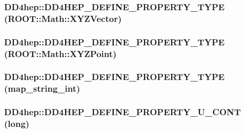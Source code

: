 \label{namespace_d_d4hep_a8b032fe993ba835daea31abfe2fa1d19}
\hypertarget{namespace_d_d4hep_a837feac073c4437c1df965f9a8fb768e}{
\subsubsection[{DD4HEP\_\-DEFINE\_\-PROPERTY\_\-TYPE}]{\setlength{\rightskip}{0pt plus 5cm}DD4hep::DD4HEP\_\-DEFINE\_\-PROPERTY\_\-TYPE (ROOT::Math::XYZVector)}}
\label{namespace_d_d4hep_a837feac073c4437c1df965f9a8fb768e}
\hypertarget{namespace_d_d4hep_a622b20d2110955cfac58aee38d3d2f62}{
\subsubsection[{DD4HEP\_\-DEFINE\_\-PROPERTY\_\-TYPE}]{\setlength{\rightskip}{0pt plus 5cm}DD4hep::DD4HEP\_\-DEFINE\_\-PROPERTY\_\-TYPE (ROOT::Math::XYZPoint)}}
\label{namespace_d_d4hep_a622b20d2110955cfac58aee38d3d2f62}
\hypertarget{namespace_d_d4hep_ade11f09970354c220f7e06750e6612f1}{
\subsubsection[{DD4HEP\_\-DEFINE\_\-PROPERTY\_\-TYPE}]{\setlength{\rightskip}{0pt plus 5cm}DD4hep::DD4HEP\_\-DEFINE\_\-PROPERTY\_\-TYPE ({\bf map\_\-string\_\-int})}}
\label{namespace_d_d4hep_ade11f09970354c220f7e06750e6612f1}
\hypertarget{namespace_d_d4hep_a67e8fcf00713a100e27262956cfd4531}{
\subsubsection[{DD4HEP\_\-DEFINE\_\-PROPERTY\_\-U\_\-CONT}]{\setlength{\rightskip}{0pt plus 5cm}DD4hep::DD4HEP\_\-DEFINE\_\-PROPERTY\_\-U\_\-CONT (long)}}
